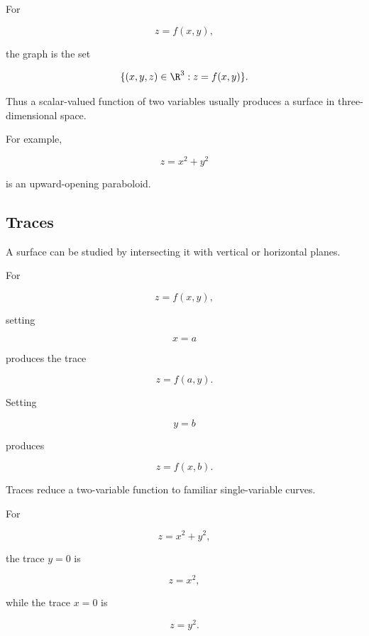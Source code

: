 For

\[ z=f(x,y), \]

the graph is the set

\[ \{(x,y,z)\in\R^3:z=f(x,y)\}. \]

Thus a scalar-valued function of two variables usually produces a surface in
three-dimensional space.

For example,

\[ z=x^2+y^2 \]

is an upward-opening paraboloid.

\begin{center}
\end{center}

\subsection{Traces}
\label{subsec:multivariable-traces}

A surface can be studied by intersecting it with vertical or horizontal
planes.

For

\[ z=f(x,y), \]

setting

\[ x=a \]

produces the trace

\[ z=f(a,y). \]

Setting

\[ y=b \]

produces

\[ z=f(x,b). \]

Traces reduce a two-variable function to familiar single-variable curves.

For

\[ z=x^2+y^2, \]

the trace \(y=0\) is

\[ z=x^2, \]

while the trace \(x=0\) is

\[ z=y^2. \]

